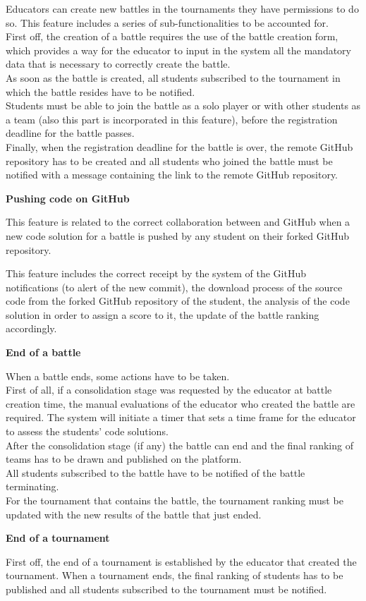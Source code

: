 Educators can create new battles in the tournaments they have permissions to do so. This feature includes a series of sub-functionalities to be accounted for.\\
First off, the creation of a battle requires the use of the battle creation form, which provides a way for the educator to input in the system all the mandatory data that is necessary to correctly create the battle. \\
As soon as the battle is created, all students subscribed to the tournament in which the battle resides have to be notified.\\
Students must be able to join the battle as a solo player or with other students as a team (also this part is incorporated in this feature), before the registration deadline for the battle passes.\\
Finally, when the registration deadline for the battle is over, the remote GitHub repository has to be created and all students who joined the battle must be notified with a message containing the link to the remote GitHub repository.

\vspace{0.5cm}

\textbf{Pushing code on GitHub}

This feature is related to the correct collaboration between \app and GitHub when a new code solution for a battle is pushed by any student on their forked GitHub repository.

This feature includes the correct receipt by the system of the GitHub notifications (to alert \app of the new commit), the download process of the source code from the forked GitHub repository of the student, the analysis of the code solution in order to assign a score to it, the update of the battle ranking accordingly.

\vspace{0.5cm}

\textbf{End of a battle}

When a battle ends, some actions have to be taken. \\
First of all, if a consolidation stage was requested by the educator at battle creation time, the manual evaluations of the educator who created the battle are required. The \app system will initiate a timer that sets a time frame for the educator to assess the students' code solutions.\\
After the consolidation stage (if any) the battle can end and the final ranking of teams has to be drawn and published on the platform.\\
All students subscribed to the battle have to be notified of the battle terminating.\\
For the tournament that contains the battle, the tournament ranking must be updated with the new results of the battle that just ended.

\vspace{0.5cm}

\textbf{End of a tournament}

First off, the end of a tournament is established by the educator that created the tournament. When a tournament ends, the final ranking of students has to be published and all students subscribed to the tournament must be notified.

\newpage






